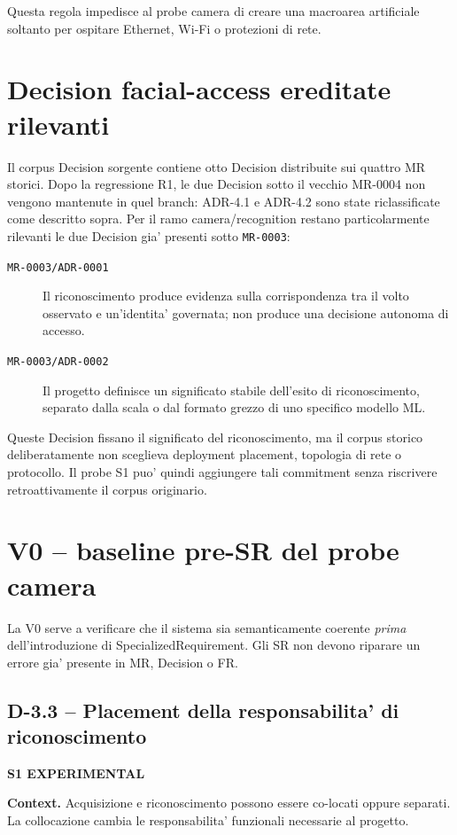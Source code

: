 \documentclass[11pt,a4paper]{article}
\newcommand{\experimental}{\textbf{S1 EXPERIMENTAL}}
\begin{document}
Questa regola impedisce al probe camera di creare una macroarea artificiale soltanto per ospitare Ethernet, Wi-Fi o protezioni di rete.

\section{Decision facial-access ereditate rilevanti}

Il corpus Decision sorgente contiene otto Decision distribuite sui quattro MR storici. Dopo la regressione R1, le due Decision sotto il vecchio MR-0004 non vengono mantenute in quel branch: ADR-4.1 e ADR-4.2 sono state riclassificate come descritto sopra. Per il ramo camera/recognition restano particolarmente rilevanti le due Decision gia' presenti sotto \texttt{MR-0003}:

\begin{description}
  \item[\texttt{MR-0003/ADR-0001}] Il riconoscimento produce evidenza sulla corrispondenza tra il volto osservato e un'identita' governata; non produce una decisione autonoma di accesso.
  \item[\texttt{MR-0003/ADR-0002}] Il progetto definisce un significato stabile dell'esito di riconoscimento, separato dalla scala o dal formato grezzo di uno specifico modello ML.
\end{description}

Queste Decision fissano il significato del riconoscimento, ma il corpus storico deliberatamente non sceglieva deployment placement, topologia di rete o protocollo. Il probe S1 puo' quindi aggiungere tali commitment senza riscrivere retroattivamente il corpus originario.

\section{V0 -- baseline pre-SR del probe camera}

La V0 serve a verificare che il sistema sia semanticamente coerente \emph{prima} dell'introduzione di SpecializedRequirement. Gli SR non devono riparare un errore gia' presente in MR, Decision o FR.

\subsection{D-3.3 -- Placement della responsabilita' di riconoscimento}

\experimental{}

\textbf{Context.} Acquisizione e riconoscimento possono essere co-locati oppure separati. La collocazione cambia le responsabilita' funzionali necessarie al progetto.
\end{document}
